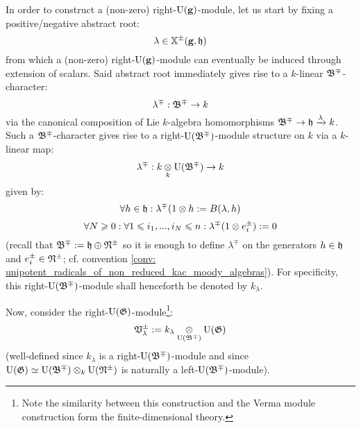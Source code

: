 \begin{remark}
                In order to construct a (non-zero) right-$\mathrm{U}(\mathbf{g})$-module, let us start by fixing a positive/negative abstract root:
                    $$\lambda \in \mathbb{X}^{\pm}(\mathbf{g}, \mathfrak{h})$$
                from which a (non-zero) right-$\mathrm{U}(\mathbf{g})$-module can eventually be induced through extension of scalars. Said abstract root immediately gives rise to a $k$-linear $\mathfrak{B}^{\mp}$-character:
                    $$\lambda^{\mp}: \mathfrak{B}^{\mp} \to k$$
                via the canonical composition of Lie $k$-algebra homomorphisms $\mathfrak{B}^{\mp} \to \mathfrak{h} \xrightarrow[]{\lambda} k$. Such a $\mathfrak{B}^{\mp}$-character gives rise to a right-$\mathrm{U}(\mathfrak{B}^{\mp})$-module structure on $k$ via a $k$-linear map:
                    $$\lambda^{\mp}: k \tensor_k \rmU(\frakB^{\mp}) \to k$$
                given by:
                    $$\forall h \in \h: \lambda^{\mp}(1 \tensor h := B(\lambda, h)$$
                    $$\forall N \geq 0: \forall 1 \leq i_1, ..., i_N \leq n: \lambda^{\mp}(1 \tensor e_i^{\pm}) := 0$$
                (recall that $\mathfrak{B}^{\mp} := \mathfrak{h} \oplus \mathfrak{N}^{\pm}$ so it is enough to define $\lambda^{\mp}$ on the generators $h \in \mathfrak{h}$ and $e_i^{\pm} \in \mathfrak{N}^{\pm}$; cf. convention \ref{conv: unipotent_radicals_of_non_reduced_kac_moody_algebras}). For specificity, this right-$\mathrm{U}(\mathfrak{B}^{\mp})$-module shall henceforth be denoted by $k_{\lambda}$.
                
                Now, consider the right-$\mathrm{U}(\mathfrak{G})$-module\footnote{Note the similarity between this construction and the Verma module construction form the finite-dimensional theory.}:
                    $$\frakV_{\lambda}^{\pm} := k_{\lambda} \tensor_{\rmU(\frakB^{\mp})} \rmU(\frakG)$$
                (well-defined since $k_{\lambda}$ is a right-$\mathrm{U}(\mathfrak{B}^{\mp})$-module and since $\rmU(\frakG) \cong \rmU(\frakB^{\mp}) \tensor_k \rmU(\frakN^{\pm})$ is naturally a left-$\mathrm{U}(\mathfrak{B}^{\mp})$-module).
                

\end{remark}
